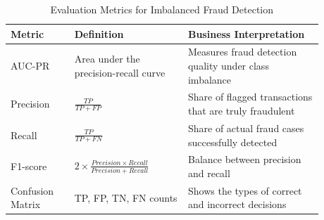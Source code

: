 \begin{table}[H]
\centering
\caption{Evaluation Metrics for Imbalanced Fraud Detection}
\label{tab:evaluation_metrics}
\begin{tabular}{
    m{0.18\linewidth}
    m{0.32\linewidth}
    m{0.38\linewidth}
}
\hline
\textbf{Metric} & \textbf{Definition} & \textbf{Business Interpretation} \\
\hline
AUC-PR & Area under the precision-recall curve & Measures fraud detection quality under class imbalance \\
Precision & $\frac{TP}{TP + FP}$ & Share of flagged transactions that are truly fraudulent \\
Recall & $\frac{TP}{TP + FN}$ & Share of actual fraud cases successfully detected \\
F1-score & $2 \times \frac{Precision \times Recall}{Precision + Recall}$ & Balance between precision and recall \\
Confusion Matrix & TP, FP, TN, FN counts & Shows the types of correct and incorrect decisions \\
\hline
\end{tabular}
\end{table}
